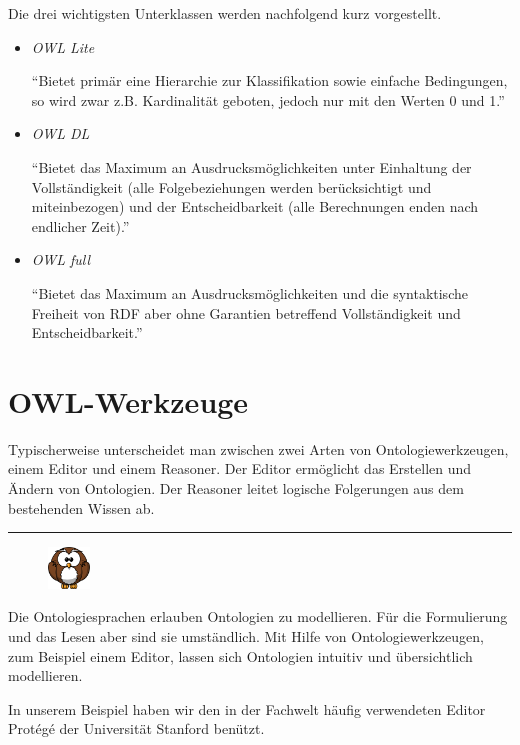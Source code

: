 Die drei wichtigsten Unterklassen werden nachfolgend kurz vorgestellt.
\begin{itemize}
    \item \textit{OWL Lite}

        ``Bietet primär eine Hierarchie zur Klassifikation sowie einfache Bedingungen, so wird zwar z.B. 				Kardinalität geboten, jedoch nur mit den Werten 0 und 1.''~\cite[S. 12]{projekt2Doc}

    \item{\textit{OWL DL}}

        ``Bietet das Maximum an Ausdrucksmöglichkeiten unter Einhaltung der Vollständigkeit (alle Folgebeziehungen werden berücksichtigt und miteinbezogen) und der Entscheidbarkeit (alle Berechnungen enden nach endlicher Zeit).''~\cite[S. 12]{projekt2Doc}

    \item{\textit{OWL full}}

        ``Bietet das Maximum an Ausdrucksmöglichkeiten und die syntaktische Freiheit von RDF aber ohne Garantien betreffend Vollständigkeit und Entscheidbarkeit.''~\cite[S. 12]{projekt2Doc}

\end{itemize}

\section{OWL-Werkzeuge}
\label{sec:owl_owl_OwlTools}
Typischerweise unterscheidet man zwischen zwei Arten von Ontologiewerkzeugen, einem Editor und einem Reasoner. Der Editor ermöglicht das Erstellen und Ändern von Ontologien. Der Reasoner leitet logische Folgerungen aus dem bestehenden Wissen ab.

\noindent\rule[1ex]{\textwidth}{1pt}
\begin{figure}
    \vspace{-19pt}
    \includegraphics[width=0.1\textwidth]{bilder/owl.png}
\end{figure}
Die Ontologiesprachen erlauben Ontologien zu modellieren. Für die Formulierung und das Lesen aber sind sie umständlich. Mit Hilfe von Ontologiewerkzeugen, zum Beispiel einem Editor, lassen sich Ontologien intuitiv und übersichtlich modellieren.

In unserem Beispiel haben wir den in der Fachwelt häufig verwendeten Editor Protégé der Universität Stanford benützt.

